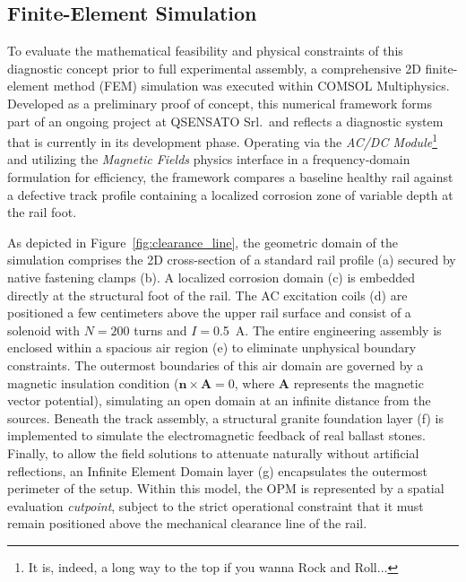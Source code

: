 \subsection{Finite-Element Simulation}
\label{sec:fem_simulation}
To evaluate the mathematical feasibility and physical constraints of this
diagnostic concept prior to full experimental assembly, a comprehensive 2D
finite-element method (\gls{FEM}) simulation was executed within COMSOL
Multiphysics. Developed as a preliminary proof of concept, this numerical
framework forms part of an ongoing project at QSENSATO Srl.\ and reflects
a diagnostic system that is currently in its development phase. Operating via
the \textit{AC/DC Module}\footnote{It is, indeed, a long way to the top if
you wanna Rock and Roll...} and utilizing the \textit{Magnetic Fields} physics
interface in a frequency-domain formulation for efficiency, the framework compares a
baseline healthy rail against a defective track profile containing a
localized corrosion zone of variable depth at the rail foot.

As depicted in Figure~\ref{fig:clearance_line}, the geometric domain
of the simulation comprises the 2D cross-section of a standard rail profile
(a) secured by native fastening clamps (b). A localized corrosion domain (c)
is embedded directly at the structural foot of the rail. The AC excitation
coils (d) are positioned a few centimeters above the upper rail surface and
consist of a solenoid with $N=200$ turns and $I=$\SI{0.5}{\ampere}.
The entire engineering assembly is enclosed within a spacious air region (e)
to eliminate unphysical boundary constraints. The outermost boundaries of
this air domain are governed by a magnetic insulation condition
($\mathbf{n} \times \mathbf{A} = 0$, where $\mathbf{A}$ represents the
magnetic vector potential), simulating an open domain at an infinite distance
from the sources. Beneath the track assembly, a structural granite foundation
layer (f) is implemented to simulate the electromagnetic feedback of real
ballast stones. Finally, to allow the field solutions to attenuate naturally
without artificial reflections, an Infinite Element Domain layer (g)
encapsulates the outermost perimeter of the setup. Within this model, the
OPM is represented by a spatial evaluation \textit{cutpoint}, subject to the
strict operational constraint that it must remain positioned above the
mechanical clearance line of the rail.

